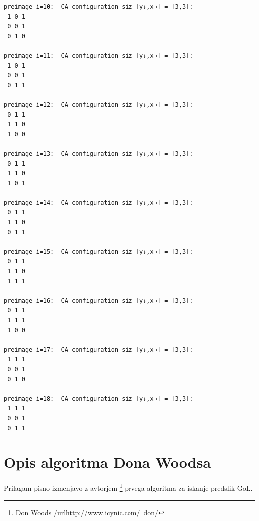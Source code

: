 \documentclass[12pt,a4paper,openany,twoside]{book}
\begin{document}
\begin{verbatim}
preimage i=10:  CA configuration siz [y↓,x→] = [3,3]:
 1 0 1
 0 0 1
 0 1 0

preimage i=11:  CA configuration siz [y↓,x→] = [3,3]:
 1 0 1
 0 0 1
 0 1 1

preimage i=12:  CA configuration siz [y↓,x→] = [3,3]:
 0 1 1
 1 1 0
 1 0 0

preimage i=13:  CA configuration siz [y↓,x→] = [3,3]:
 0 1 1
 1 1 0
 1 0 1

preimage i=14:  CA configuration siz [y↓,x→] = [3,3]:
 0 1 1
 1 1 0
 0 1 1

preimage i=15:  CA configuration siz [y↓,x→] = [3,3]:
 0 1 1
 1 1 0
 1 1 1

preimage i=16:  CA configuration siz [y↓,x→] = [3,3]:
 0 1 1
 1 1 1
 1 0 0

preimage i=17:  CA configuration siz [y↓,x→] = [3,3]:
 1 1 1
 0 0 1
 0 1 0

preimage i=18:  CA configuration siz [y↓,x→] = [3,3]:
 1 1 1
 0 0 1
 0 1 1
\end{verbatim}


\chapter{Opis algoritma Dona Woodsa}

Prilagam pisno izmenjavo z avtorjem \footnote{Don Woods /url{http://www.icynic.com/~don/}} prvega algoritma za iskanje predslik GoL.
\end{document}
